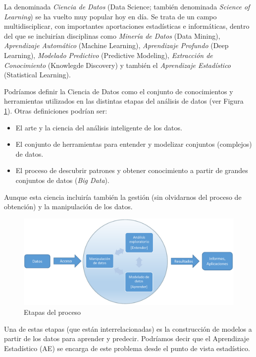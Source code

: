 \documentclass[
  spanish,
]{book}
\theoremstyle{break}
\theoremstyle{definition}
\theoremstyle{definition}
\theoremstyle{definition}
\theoremstyle{definition}
\theoremstyle{remark}
\begin{document}
La denominada \emph{Ciencia de Datos} (Data Science; también denominada \emph{Science of Learning}) se ha vuelto muy popular hoy en día.
Se trata de un campo multidisciplicar, con importantes aportaciones estadísticas e informáticas, dentro del que se incluirían disciplinas como \emph{Minería de Datos} (Data Mining), \emph{Aprendizaje Automático} (Machine Learning), \emph{Aprendizaje Profundo} (Deep Learning), \emph{Modelado Predictivo} (Predictive Modeling), \emph{Extracción de Conocimiento} (Knowlegde Discovery) y también el \emph{Aprendizaje Estadístico} (Statistical Learning).

Podríamos definir la Ciencia de Datos como el conjunto de conocimientos y herramientas utilizados en las distintas etapas del análisis de datos (ver Figura \ref{fig:esquema}). Otras definiciones podrían ser:

\begin{itemize}
\item
  El arte y la ciencia del análisis inteligente de los datos.
\item
  El conjunto de herramientas para entender y modelizar conjuntos
  (complejos) de datos.
\item
  El proceso de descubrir patrones y obtener conocimiento a partir de
  grandes conjuntos de datos (\emph{Big Data}).
\end{itemize}

Aunque esta ciencia incluiría también la gestión (sin olvidarnos del proceso de obtención) y la manipulación de los datos.

\begin{figure}[!htb]

{\centering \includegraphics[width=0.8\linewidth]{images/esquema2} 

}

\caption{Etapas del proceso}\label{fig:esquema}
\end{figure}

Una de estas etapas (que están interrelacionadas) es la construcción de modelos a partir de los datos para aprender y predecir. Podríamos decir que el Aprendizaje Estadístico (AE) se encarga de este problema desde el punto de vista estadístico.
\end{document}
